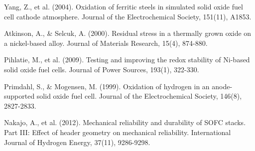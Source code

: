 \documentclass[10pt,conference]{IEEEtran}
\begin{document}
\begin{thebibliography}{99}
 Yang, Z., et al. (2004). Oxidation of ferritic steels in simulated solid oxide fuel cell cathode atmosphere. Journal of the Electrochemical Society, 151(11), A1853.

 Atkinson, A., \& Selcuk, A. (2000). Residual stress in a thermally grown oxide on a nickel-based alloy. Journal of Materials Research, 15(4), 874-880.

 Pihlatie, M., et al. (2009). Testing and improving the redox stability of Ni-based solid oxide fuel cells. Journal of Power Sources, 193(1), 322-330.

 Primdahl, S., \& Mogensen, M. (1999). Oxidation of hydrogen in an anode-supported solid oxide fuel cell. Journal of the Electrochemical Society, 146(8), 2827-2833.

 Nakajo, A., et al. (2012). Mechanical reliability and durability of SOFC stacks. Part III: Effect of header geometry on mechanical reliability. International Journal of Hydrogen Energy, 37(11), 9286-9298.

\end{thebibliography}
\end{document}
